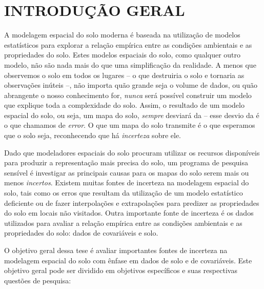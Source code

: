 \artigofalse
\chapter{INTRODUÇÃO GERAL}
\label{appen:introduction-pt}

A modelagem espacial do solo moderna é baseada na utilização de modelos estatísticos para explorar a relação 
empírica entre as condições ambientais e as propriedades do solo. Estes modelos espaciais do solo, como 
qualquer outro modelo, não são nada mais do que uma simplificação da realidade. A menos que observemos o solo 
em todos os lugares -- o que destruiria o solo e tornaria as observações inúteis --, não importa quão grande 
seja o volume de dados, ou quão abrangente o nosso conhecimento for, \emph{nunca} será possível construir um 
modelo que explique toda a complexidade do solo. Assim, o resultado de um modelo espacial do solo, ou seja, um 
mapa do solo, \emph{sempre} desviará da  -- esse desvio da  é o que chamamos de 
\emph{error}. O que um mapa do solo transmite é o que esperamos que o solo seja, reconhecendo que há 
\emph{incerteza} sobre ele.

Dado que modeladores espaciais do solo procuram utilizar os recursos disponíveis para produzir a representação 
mais precisa do solo, um programa de pesquisa sensível é investigar as principais causas para os mapas do solo 
serem mais ou menos \emph{incertos}. Existem muitas fontes de incerteza na modelagem espacial do solo, tais 
como os erros que resultam da utilização de um modelo estatístico deficiente ou de fazer interpolações e 
extrapolações para predizer as propriedades do solo em locais não visitados. Outra importante fonte de 
incerteza é os dados utilizados para avaliar a relação empírica entre as condições ambientais e as 
propriedades do solo: dados de covariáveis e solo.

O objetivo geral dessa tese é avaliar importantes fontes de incerteza na modelagem espacial do solo com ênfase 
em dados de solo e de covariáveis. Este objetivo geral pode ser dividido em objetivos específicos e suas 
respectivas questões de pesquisa:

